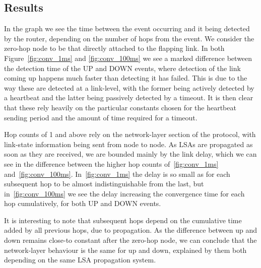 \documentclass[withindex,glossary,openany]{cam-thesis}
\begin{document}
\subsection{Results}

In the graph we see the time between the event occurring and it being detected by the router, depending on the number of hops from the event. We consider the zero-hop node to be that directly attached to the flapping link. In both Figure~\ref{fig:conv_1ms} and \ref{fig:conv_100ms} we see a marked difference between the detection time of the UP and DOWN events, where detection of the link coming up happens much faster than detecting it has failed. This is due to the way these are detected at a link-level, with the former being actively detected by a heartbeat and the latter being passively detected by a timeout. It is then clear that these rely heavily on the particular constants chosen for the heartbeat sending period and the amount of time required for a timeout.

Hop counts of 1 and above rely on the network-layer section of the protocol, with link-state information being sent from node to node. As LSAs are propagated as soon as they are received, we are bounded mainly by the link delay, which we can see in the difference between the higher hop counts of~\ref{fig:conv_1ms} and~\ref{fig:conv_100ms}. In~\ref{fig:conv_1ms} the delay is so small as for each subsequent hop to be almost indistinguishable from the last, but in~\ref{fig:conv_100ms} we see the delay increasing the convergence time for each hop cumulatively, for both UP and DOWN events.

It is interesting to note that subsequent hops depend on the cumulative time added by all previous hops, due to propagation. As the difference between up and down remains close-to constant after the zero-hop node, we can conclude that the network-layer behaviour is the same for up and down, explained by them both depending on the same LSA propagation system.
\end{document}
